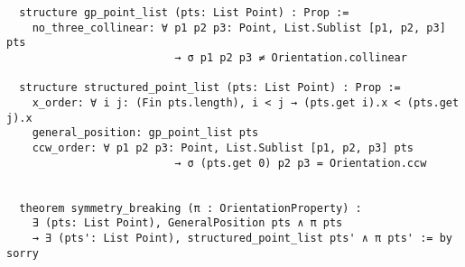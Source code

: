 \begin{lstlisting}
  structure gp_point_list (pts: List Point) : Prop :=
    no_three_collinear: ∀ p1 p2 p3: Point, List.Sublist [p1, p2, p3] pts
                          → σ p1 p2 p3 ≠ Orientation.collinear

  structure structured_point_list (pts: List Point) : Prop :=
    x_order: ∀ i j: (Fin pts.length), i < j → (pts.get i).x < (pts.get j).x
    general_position: gp_point_list pts
    ccw_order: ∀ p1 p2 p3: Point, List.Sublist [p1, p2, p3] pts
                          → σ (pts.get 0) p2 p3 = Orientation.ccw


  theorem symmetry_breaking (π : OrientationProperty) :
    ∃ (pts: List Point), GeneralPosition pts ∧ π pts
    → ∃ (pts': List Point), structured_point_list pts' ∧ π pts' := by sorry


\end{lstlisting}
